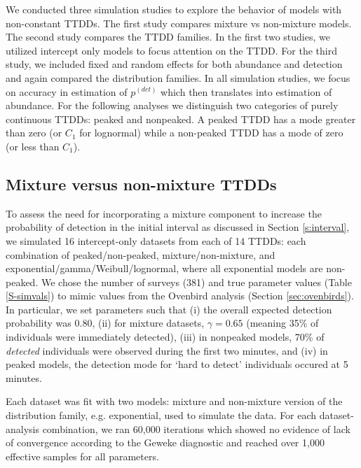 \documentclass[12pt]{article}
\newcommand{\pdet}{p^{(det)}}
\begin{document}
We conducted three simulation studies to explore the behavior of models with non-constant TTDDs.
The first study compares mixture vs non-mixture models.
The second study compares the TTDD families.
In the first two studies, we utilized intercept only models to focus attention on the TTDD. 
For the third study, we included fixed and random effects for both abundance and detection and again compared the distribution families. 
In all simulation studies, we focus on accuracy in estimation of $\pdet$ which then translates into estimation of abundance. 
For the following analyses we distinguish two categories of purely continuous TTDDs: peaked and nonpeaked.  
A peaked TTDD has a mode greater than zero (or $C_1$ for lognormal) while a non-peaked TTDD has a mode of zero (or less than $C_1$).









\subsection{Mixture versus non-mixture TTDDs}\label{sec:mixture}

To assess the need for incorporating a mixture component to increase the probability of detection in the initial interval as discussed in Section \ref{s:interval}, we simulated 16 intercept-only datasets from each of 14 TTDDs: each combination of peaked/non-peaked, mixture/non-mixture, and exponential/gamma/Weibull/lognormal, where all exponential models are non-peaked.  
We chose the number of surveys (381) and true parameter values (Table \ref{S-simvals}) to mimic values from the Ovenbird analysis (Section \ref{sec:ovenbirds}).  
In particular, we set parameters such that (i) the overall expected detection probability was 0.80, (ii) for mixture datasets, $\gamma = 0.65$ (meaning 35\% of individuals were immediately detected), (iii) in nonpeaked models, 70\% of \textit{detected} individuals were observed during the first two minutes, and (iv) in peaked models, the detection mode for `hard to detect' individuals occured at 5 minutes.

Each dataset was fit with two models: mixture and non-mixture version of the distribution family, e.g. exponential, used to simulate the data.
For each dataset-analysis combination, we ran 60,000 iterations which showed no evidence of lack of convergence according to the Geweke diagnostic and reached over 1,000 effective samples for all parameters. 
\end{document}
